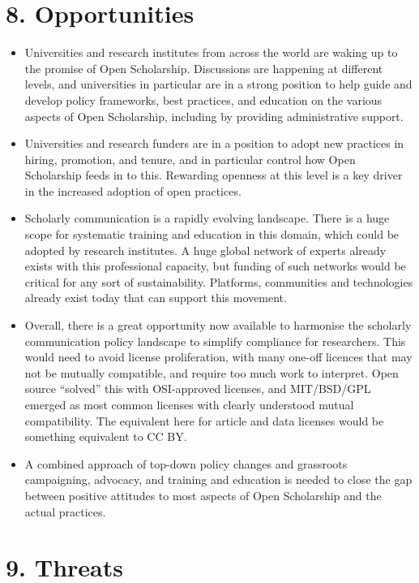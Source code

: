 \section{8. Opportunities }\label{opportunities}

\begin{itemize}
\item
  Universities and research institutes from across the world are waking
  up to the promise of Open Scholarship. Discussions are happening at
  different levels, and universities in particular are in a strong
  position to help guide and develop policy frameworks, best practices,
  and education on the various aspects of Open Scholarship, including by
  providing administrative support.
\item
  Universities and research funders are in a position to adopt new
  practices in hiring, promotion, and tenure, and in particular control
  how Open Scholarship feeds in to this. Rewarding openness at this
  level is a key driver in the increased adoption of open practices.
\item
  Scholarly communication is a rapidly evolving landscape. There is a
  huge scope for systematic training and education in this domain, which
  could be adopted by research institutes. A huge global network of
  experts already exists with this professional capacity, but funding of
  such networks would be critical for any sort of sustainability.
  Platforms, communities and technologies already exist today that can
  support this movement.
\item
  Overall, there is a great opportunity now available to harmonise the
  scholarly communication policy landscape to simplify compliance for
  researchers. This would need to avoid license proliferation, with many
  one-off licences that may not be mutually compatible, and require too
  much work to interpret. Open source ``solved'' this with OSI-approved
  licenses, and MIT/BSD/GPL emerged as most common licenses with clearly
  understood mutual compatibility. The equivalent here for article and
  data licenses would be something equivalent to CC BY.
\item
  A combined approach of top-down policy changes and grassroots
  campaigning, advocacy, and training and education is needed to close
  the gap between positive attitudes to most aspects of Open Scholarship
  and the actual practices.
\end{itemize}

\section{9. Threats }\label{threats}


